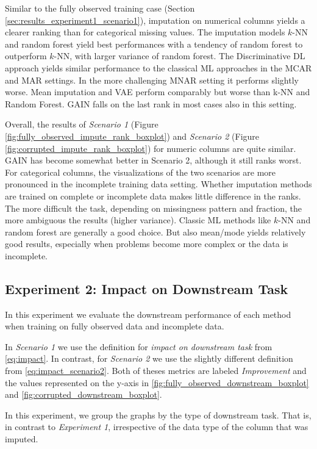 Similar to the fully observed training case (Section \ref{sec:results_experiment1_scenario1}), imputation on numerical columns yields a clearer ranking than for categorical missing values. The imputation models $k$-NN and random forest yield best performances with a tendency of random forest to outperform $k$-NN, with larger variance of random forest. The Discriminative DL approach yields similar performance to the classical ML approaches in the MCAR and MAR settings. In the more challenging MNAR setting it performs slightly worse. Mean imputation and VAE perform comparably but worse than k-NN and Random Forest. GAIN falls on the last rank in most cases also in this setting.

Overall, the results of \textit{Scenario 1} (Figure \ref{fig:fully_observed_impute_rank_boxplot}) and \textit{Scenario 2} (Figure \ref{fig:corrupted_impute_rank_boxplot}) for numeric columns are quite similar. GAIN has become somewhat better in Scenario 2, although it still ranks worst. For categorical columns, the visualizations of the two scenarios are more pronounced in the incomplete training data setting. Whether imputation methods are trained on complete or incomplete data makes little difference in the ranks. The more difficult the task, depending on missingness pattern and fraction, the more ambiguous the results (higher variance). Classic ML methods like $k$-NN and random forest are generally a good choice. But also mean/mode yields relatively good results, especially when problems become more complex or the data is incomplete.


\subsection{Experiment 2: Impact on Downstream Task}

In this experiment we evaluate the downstream performance of each method when training on fully observed data and incomplete data.

In \textit{Scenario 1} we use the definition for \textit{impact on downstream task} from \autoref{eq:impact}. In contrast, for \textit{Scenario 2} we use the slightly different definition from \autoref{eq:impact_scenario2}. Both of theses metrics are labeled \textit{Improvement} and the values represented on the y-axis in \autoref{fig:fully_observed_downstream_boxplot} and \autoref{fig:corrupted_downstream_boxplot}.

In this experiment, we group the graphs by the type of downstream task. That is, in contrast to \textit{Experiment 1}, irrespective of the data type of the column that was imputed.

